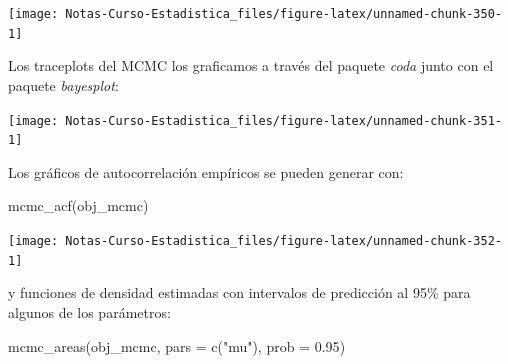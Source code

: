 \documentclass[
  12pt,
]{book}
\newenvironment{Shaded}{\begin{snugshade}}{\end{snugshade}}
\newcommand{\AttributeTok}[1]{\textcolor[rgb]{0.77,0.63,0.00}{#1}}
\newcommand{\DecValTok}[1]{\textcolor[rgb]{0.00,0.00,0.81}{#1}}
\newcommand{\FloatTok}[1]{\textcolor[rgb]{0.00,0.00,0.81}{#1}}
\newcommand{\FunctionTok}[1]{\textcolor[rgb]{0.00,0.00,0.00}{#1}}
\newcommand{\NormalTok}[1]{#1}
\newcommand{\OtherTok}[1]{\textcolor[rgb]{0.56,0.35,0.01}{#1}}
\newcommand{\SpecialCharTok}[1]{\textcolor[rgb]{0.00,0.00,0.00}{#1}}
\newcommand{\StringTok}[1]{\textcolor[rgb]{0.31,0.60,0.02}{#1}}
\theoremstyle{definition}
\theoremstyle{definition}
\theoremstyle{definition}
\theoremstyle{definition}
\theoremstyle{remark}
\begin{document}
\begin{center}\texttt{[image: Notas-Curso-Estadistica\_files/figure-latex/unnamed-chunk-350-1]} \end{center}

Los traceplots del MCMC los graficamos a través del paquete \emph{coda} junto con el paquete \emph{bayesplot}:

\begin{Shaded}
\end{Shaded}

\begin{center}\texttt{[image: Notas-Curso-Estadistica\_files/figure-latex/unnamed-chunk-351-1]} \end{center}

Los gráficos de autocorrelación empíricos se pueden generar con:

\begin{Shaded}
\begin{Highlighting}[]
\FunctionTok{mcmc\_acf}\NormalTok{(obj\_mcmc)}
\end{Highlighting}
\end{Shaded}

\begin{center}\texttt{[image: Notas-Curso-Estadistica\_files/figure-latex/unnamed-chunk-352-1]} \end{center}

y funciones de densidad estimadas con intervalos de predicción al 95\% para algunos de los parámetros:

\begin{Shaded}
\begin{Highlighting}[]
\FunctionTok{mcmc\_areas}\NormalTok{(obj\_mcmc, }\AttributeTok{pars =} \FunctionTok{c}\NormalTok{(}\StringTok{"mu"}\NormalTok{), }\AttributeTok{prob =} \FloatTok{0.95}\NormalTok{)}
\end{Highlighting}
\end{Shaded}
\end{document}
